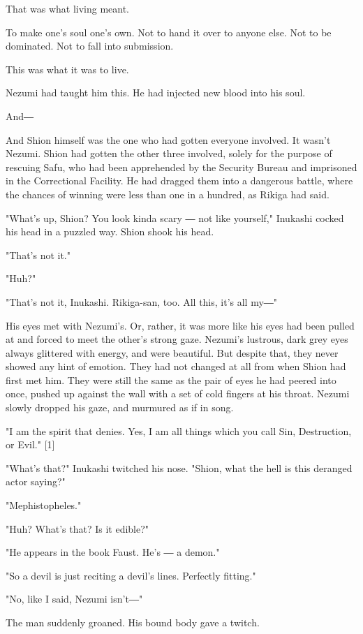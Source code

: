 That was what living meant.

To make one's soul one's own. Not to hand it over to anyone else. Not to
be dominated. Not to fall into submission.

This was what it was to live.

Nezumi had taught him this. He had injected new blood into his soul.

And―

And Shion himself was the one who had gotten everyone involved. It
wasn't Nezumi. Shion had gotten the other three involved, solely for the
purpose of rescuing Safu, who had been apprehended by the Security
Bureau and imprisoned in the Correctional Facility. He had dragged them
into a dangerous battle, where the chances of winning were less than one
in a hundred, as Rikiga had said.

"What's up, Shion? You look kinda scary ― not like yourself," Inukashi
cocked his head in a puzzled way. Shion shook his head.

"That's not it."

"Huh?"

"That's not it, Inukashi. Rikiga-san, too. All this, it's all my―"

His eyes met with Nezumi's. Or, rather, it was more like his eyes had
been pulled at and forced to meet the other's strong gaze. Nezumi's
lustrous, dark grey eyes always glittered with energy, and were
beautiful. But despite that, they never showed any hint of emotion. They
had not changed at all from when Shion had first met him. They were
still the same as the pair of eyes he had peered into once, pushed up
against the wall with a set of cold fingers at his throat. Nezumi slowly
dropped his gaze, and murmured as if in song.

"I am the spirit that denies. Yes, I am all things which you call Sin,
Destruction, or Evil." {[}1{]}

"What's that?" Inukashi twitched his nose. "Shion, what the hell is this
deranged actor saying?"

"Mephistopheles."

"Huh? What's that? Is it edible?"

"He appears in the book Faust. He's ― a demon."

"So a devil is just reciting a devil's lines. Perfectly fitting."

"No, like I said, Nezumi isn't―"

The man suddenly groaned. His bound body gave a twitch.


